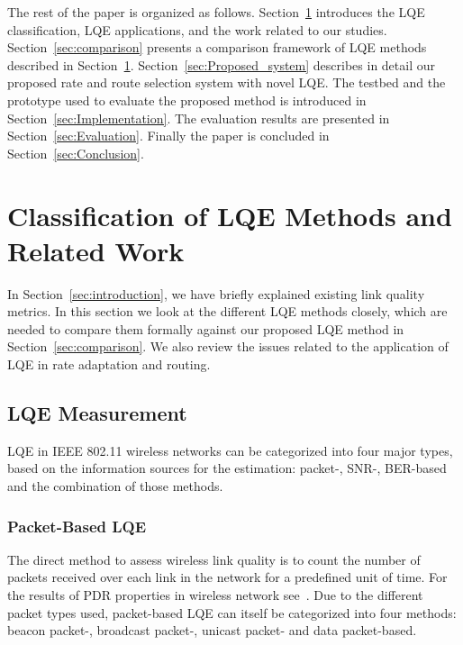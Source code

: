 \documentclass[11pt,draftclsnofoot,journal,onecolumn]{IEEEtran}
\begin{document}
The rest of the paper is organized as follows. Section~\ref{sec:related_work} introduces the LQE classification, LQE applications, and the work related to our studies. Section~\ref{sec:comparison} presents a comparison framework of LQE methods described in Section~\ref{sec:related_work}. Section~\ref{sec:Proposed_system} describes in detail our proposed rate and route selection system with novel LQE. The testbed and the prototype used to evaluate the proposed method is introduced in Section~\ref{sec:Implementation}. The evaluation results are presented in Section~\ref{sec:Evaluation}. Finally the paper is concluded in Section~\ref{sec:Conclusion}.

\section{Classification of LQE Methods and Related Work}
\label{sec:related_work}

In Section~\ref{sec:introduction}, we have briefly explained existing link quality metrics. In this section we look at the different LQE methods closely, which are needed to compare them formally against our proposed LQE method in Section~\ref{sec:comparison}. We also review the issues related to the application of LQE in rate adaptation and routing.

\subsection{LQE Measurement}
\label{sec:LQE measurement}

LQE in IEEE 802.11 wireless networks can be categorized into four major types, based on the information sources for the estimation: packet-, SNR-, BER-based and the combination of those methods.

\subsubsection{Packet-Based LQE}
\label{sec:LQE_packet}

The direct method to assess wireless link quality is to count the number of packets received over each link in the network for a predefined unit of time. For the results of PDR properties in wireless network see~\cite{Aguayo_MCCR_2004,jardosh_2005_E-WIND-05}. Due to the different packet types used, packet-based LQE can itself be categorized into four methods: beacon packet-, broadcast packet-, unicast packet- and data packet-based.
\end{document}
